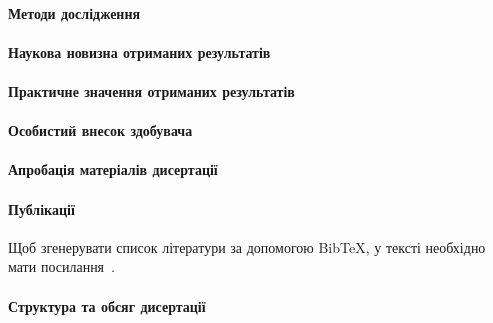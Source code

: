\documentclass[
]{mon2017dev-aref}[2021/04/12]
\theoremstyle{plain}
\theoremstyle{definition}
\theoremstyle{remark}
\begin{document}
\paragraph{Методи дослідження}

\paragraph{Наукова новизна отриманих результатів}

\paragraph{Практичне значення отриманих результатів}

\paragraph{Особистий внесок здобувача}

\paragraph{Апробація матеріалів дисертації}

\paragraph{Публікації}

Щоб згенерувати список літератури за допомогою Bib\TeX, у тексті
необхідно мати посилання~\cite{Bar98fasp1,Bar98fasp2,PrB01umc}.

\paragraph{Структура та обсяг дисертації}
\end{document}
